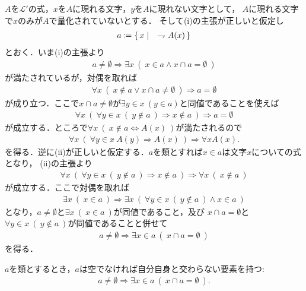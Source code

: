 	\begin{prf}
		$A$を$\mathcal{L}'$の式，$x$を$A$に現れる文字，$y$を$A$に現れない文字として，
		$A$に現れる文字で$x$のみが$A$で量化されていないとする．
		そして(i)の主張が正しいと仮定し
		\begin{align}
			a \coloneqq \left\{\, x \mid \quad \rightharpoondown A(x)\, \right\}
		\end{align}
		とおく．いま(i)の主張より
		\begin{align}
			a \neq \emptyset \Longrightarrow 
			\exists x\ (\ x \in a \wedge x \cap a = \emptyset\ )
		\end{align}
		が満たされているが，対偶を取れば
		\begin{align}
			\forall x\ (\ x \notin a \vee x \cap a \neq \emptyset\ )
			\Longrightarrow a = \emptyset
		\end{align}
		が成り立つ．ここで$x \cap a \neq \emptyset$が$\exists y \in x\ (y \in a)$と同値であることを使えば
		\begin{align}
			\forall x\ (\ \forall y \in x\ (\ y \notin a\ ) \Longrightarrow x \notin a\ )
			\Longrightarrow a = \emptyset
		\end{align}
		が成立する．ところで$\forall x\ (\ x \notin a \Longleftrightarrow A(x)\ )$が満たされるので
		\begin{align}
			\forall x\ \left(\ \forall y \in x\ A(y)
			\Longrightarrow A(x)\ \right)
			\Longrightarrow \forall x A(x).
		\end{align}
		を得る．逆に(ii)が正しいと仮定する．$a$を類とすれば$x \in a$は文字$x$についての式となり，
		(ii)の主張より
		\begin{align}
			\forall x\ \left(\ \forall y \in x\ (\ y \notin a\ )
			\Longrightarrow x \notin a\ \right)
			\Longrightarrow \forall x\ (\ x \notin a\ )
		\end{align}
		が成立する．ここで対偶を取れば
		\begin{align}
			\exists x\ (\ x \in a\ ) \Longrightarrow 
			\exists x\ \left(\ \forall y \in x\ (\ y \notin a\ )
			\wedge x \in a\ \right)
		\end{align}
		となり，$a \neq \emptyset$と$\exists x\ (\ x \in a\ )$が同値であること，及び
		$x \cap a = \emptyset$と$\forall y \in x\ (\ y \notin a\ )$が同値であることと併せて
		\begin{align}
			a \neq \emptyset \Longrightarrow 
			\exists x \in a\ (\ x \cap a = \emptyset\ )
		\end{align}
		を得る．
		\QED
	\end{prf}
	
	\begin{screen}
		\begin{axm}[正則性公理]
			$a$を類とするとき，$a$は空でなければ自分自身と交わらない要素を持つ:
			\begin{align}
				a \neq \emptyset \Longrightarrow 
				\exists x \in a\ (\ x \cap a = \emptyset\ ).
			\end{align}
		\end{axm}
	\end{screen}
	
